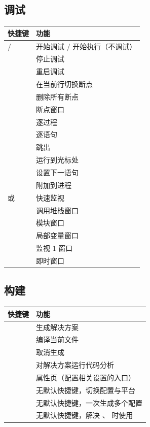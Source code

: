\subsection{调试}
\begin{longtable}{L{4.6cm}L{10.2cm}}
\toprule
\textbf{快捷键} & \textbf{功能} \\ \midrule
\endhead \bottomrule \endlastfoot
{} /  & 开始调试 / 开始执行（不调试） \\
 & 停止调试 \\
 & 重启调试 \\
 & 在当前行切换断点 \\
 & 删除所有断点 \\
 & 断点窗口 \\
 & 逐过程 \\
 & 逐语句 \\
 & 跳出 \\
 & 运行到光标处 \\
 & 设置下一语句 \\
 & 附加到进程 \\
 或  & 快速监视 \\
 & 调用堆栈窗口 \\
 & 模块窗口 \\
 & 局部变量窗口 \\
 & 监视 1 窗口 \\
 & 即时窗口 \\
\end{longtable}
\subsection{构建}
\begin{longtable}{L{4.6cm}L{10.2cm}}
\toprule
\textbf{快捷键} & \textbf{功能} \\ \midrule
\endhead \bottomrule \endlastfoot
{} & 生成解决方案 \\
 & 编译当前文件 \\
 & 取消生成 \\
 & 对解决方案运行代码分析 \\
 & 属性页（配置相关设置的入口） \\
 & 无默认快捷键，切换配置与平台 \\
 & 无默认快捷键，一次生成多个配置 \\
 & 无默认快捷键，解决 、 时使用 \\
\end{longtable}
